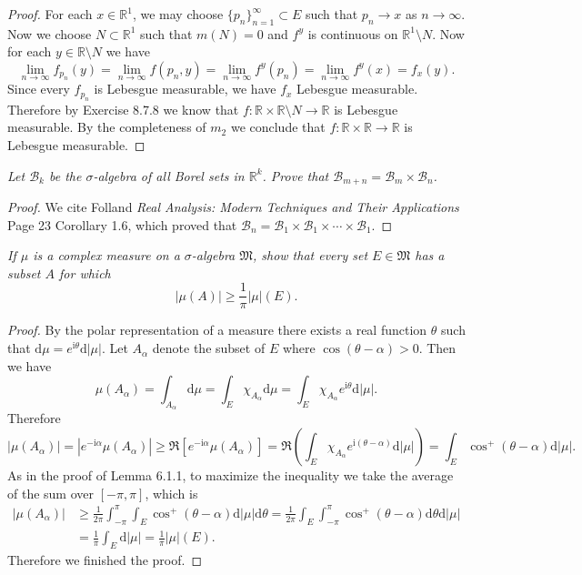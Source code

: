 \begin{proof}
For each $x\in\mathbb{R}^1$, we may choose $\{p_n\}_{n=1}^\infty\subset E$ such that $p_n\to x$ as $n\to\infty$. Now we choose $N\subset\mathbb{R}^1$ such that $m(N)=0$ and $f^y$ is continuous on $\mathbb{R}^1\setminus N$. Now for each $y\in\mathbb{R}\setminus N$ we have 
$$
\lim_{n\rightarrow \infty} f_{p_n}\left( y \right) =\lim_{n\rightarrow \infty} f\left( p_n,y \right) =\lim_{n\rightarrow \infty} f^y\left( p_n \right) =\lim_{n\rightarrow \infty} f^y\left( x \right) =f_x\left( y \right) .
$$
Since every $f_{p_n}$ is Lebesgue measurable, we have $f_x$ Lebesgue measurable. Therefore by Exercise 8.7.8 we know that $f:\mathbb{R}\times\mathbb{R}\setminus N\to\mathbb{R}$ is Lebesgue measurable. By the completeness of $m_2$ we conclude that $f:\mathbb{R}\times\mathbb{R}\to\mathbb{R}$ is Lebesgue measurable.
\end{proof}
\begin{problem}\em
Let $\mathcal{B}_k$ be the $\sigma$-algebra of all Borel sets in $\mathbb{R}^k$. Prove that $\mathcal{B}_{m+n}=\mathcal{B}_m\times\mathcal{B}_n$.
\end{problem}
\begin{proof}
We cite Folland \textit{Real Analysis: Modern Techniques and Their Applications} Page 23 Corollary 1.6, which proved that $\mathcal{B}_n=\mathcal{B}_1\times\mathcal{B}_1\times\cdots\times\mathcal{B}_1$.
\end{proof}
\begin{problem}\em
If $\mu$ is a complex measure on a $\sigma$-algebra $\mathfrak{M}$, show that every set $E\in\mathfrak{M}$ has a subset $A$ for which 
$$|\mu(A)|\ge\frac{1}{\pi}|\mu|(E).$$
\end{problem}
\begin{proof}
By the polar representation of a measure there exists a real function $\theta$ such that $\mathrm{d}\mu=e^{\mathrm{i}\theta}\mathrm{d}|\mu|$. Let $A_\alpha$ denote the subset of $E$ where $\cos(\theta-\alpha)>0$. Then we have 
$$
\mu \left( A_{\alpha} \right) =\int_{A_{\alpha}}{\mathrm{d}\mu}=\int_E{\chi _{A_{\alpha}}\mathrm{d}\mu}=\int_E{\chi _{A_{\alpha}}e^{\mathrm{i}\theta}\mathrm{d}\left| \mu \right|}.
$$
Therefore 
$$
\left| \mu \left( A_{\alpha} \right) \right|=\left| e^{-\mathrm{i}\alpha}\mu \left( A_{\alpha} \right) \right|\ge \Re \left[ e^{-\mathrm{i}\alpha}\mu \left( A_{\alpha} \right) \right] =\Re \left( \int_E{\chi _{A_{\alpha}}e^{\mathrm{i}\left( \theta -\alpha \right)}\mathrm{d}\left| \mu \right|} \right) =\int_E{\cos ^+\left( \theta -\alpha \right) \mathrm{d}\left| \mu \right|}.
$$
As in the proof of Lemma 6.1.1, to maximize the inequality we take the average of the sum over $[-\pi,\pi]$, which is 
$$
\begin{aligned}
\left| \mu \left( A_{\alpha} \right) \right|&\ge \frac{1}{2\pi}\int_{-\pi}^{\pi}{\int_E{\cos ^+\left( \theta -\alpha \right) \mathrm{d}\left| \mu \right|}\mathrm{d}\theta}=\frac{1}{2\pi}\int_E{\int_{-\pi}^{\pi}{\cos ^+\left( \theta -\alpha \right) \mathrm{d}\theta}\mathrm{d}\left| \mu \right|}
\\
&=\frac{1}{\pi}\int_E{\mathrm{d}\left| \mu \right|}=\frac{1}{\pi}\left| \mu \right|\left( E \right) .
\end{aligned}
$$
Therefore we finished the proof.
\end{proof}
